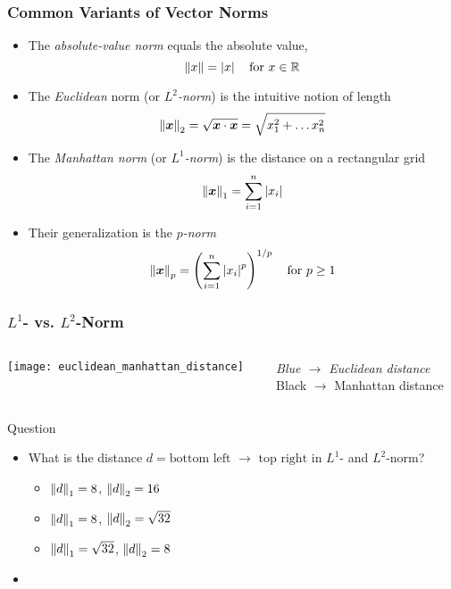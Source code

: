 \documentclass[%
  final,
  11pt, 
  show notes, %
  t, %
  fleqn, %
]{beamer}
\begin{document}
\begin{frame}[fragile]
  \frametitle{Common Variants of Vector Norms}
\begin{itemize}
\item The \emph{absolute-value norm} equals the absolute value, \ie 
\begin{equation*}
\left\Vert x \right\Vert = \left\lvert x \right\rvert \quad \text{for } x \in\mathbb{R}
\end{equation*}
\item The \emph{Euclidean} norm (or \emph{$L^2$-norm}) is the intuitive notion of length
\begin{equation*}
\left\Vert \bm{x} \right\Vert_2 = \sqrt{\bm{x} \cdot \bm{x}} = \sqrt{x_1^2 + \ldots x_n^2}
\end{equation*}
\item The \emph{Manhattan norm} (or \emph{$L^1$-norm}) is the distance on a rectangular grid
\begin{equation*}
\left\Vert \bm{x} \right\Vert_1 = \sum_{i=1}^{n} \left\lvert x_i \right\rvert
\end{equation*}
\item Their generalization is the \emph{$p$-norm} 
\begin{equation*}
\left\Vert \bm{x} \right\Vert_p = \left( \sum_{i=1}^{n} \left\lvert x_i \right\rvert^p \right)^{1/p} \quad \text{for } p \geq 1
\end{equation*}
\end{itemize}
\end{frame}

\begin{frame}[fragile]
  \frametitle{$L^1$- vs. $L^2$-Norm}
\begin{columns}[T]
\begin{column}{.3\textwidth}
\texttt{[image: euclidean\_manhattan\_distance]}
\end{column}
\begin{column}{.65\textwidth}
{\small \emph{Blue $\rightarrow$ Euclidean distance} \\
Black $\rightarrow$ Manhattan distance}
\end{column}
\end{columns}

\begin{exampleblock}{Question}
\begin{itemize}
\item What is the distance $d = \text{bottom left }\rightarrow\text{ top right}$ in $L^1$- and $L^2$-norm?
\begin{itemize}
\item $\left\Vert d \right\Vert_1 = 8$, $\left\Vert d \right\Vert_2 = 16$
\item $\left\Vert d \right\Vert_1 = 8$, $\left\Vert d \right\Vert_2 = \sqrt{32}$
\item $\left\Vert d \right\Vert_1 = \sqrt{32}$, $\left\Vert d \right\Vert_2 = 8$
\end{itemize}
\item \CourseQuiz
\end{itemize}
\end{exampleblock} 
\end{frame}
\end{document}
